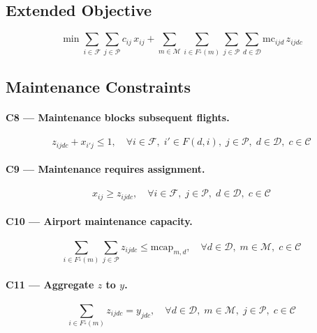 \documentclass[11pt, a4paper]{article}
\theoremstyle{plain}
\theoremstyle{definition}
\theoremstyle{remark}
\newcommand{\F}{\mathcal{F}}        %
\newcommand{\P}{\mathcal{P}}        %
\newcommand{\D}{\mathcal{D}}        %
\newcommand{\C}{\mathcal{C}}        %
\newcommand{\MA}{\mathcal{M}}       %
\begin{document}
\subsection{Extended Objective}

\begin{equation}
  \min \sum_{i \in \F}\sum_{j \in \P} c_{ij}\, x_{ij}
       + \sum_{m \in \MA}\sum_{i \in F^{\downarrow}(m)}\sum_{j \in \P}\sum_{d \in \D}
         \text{mc}_{ijd}\, z_{ijdc}
  \label{eq:obj_ext}
\end{equation}

\subsection{Maintenance Constraints}

\paragraph{C8 — Maintenance blocks subsequent flights.}
\begin{equation}
  z_{ijdc} + x_{i'j} \leq 1,
  \quad \forall i \in \F,\; i' \in F(d,i),\; j \in \P,\; d \in \D,\; c \in \C
  \label{eq:c8}
\end{equation}

\paragraph{C9 — Maintenance requires assignment.}
\begin{equation}
  x_{ij} \geq z_{ijdc},
  \quad \forall i \in \F,\; j \in \P,\; d \in \D,\; c \in \C
  \label{eq:c9}
\end{equation}

\paragraph{C10 — Airport maintenance capacity.}
\begin{equation}
  \sum_{i \in F^{\downarrow}(m)} \sum_{j \in \P} z_{ijdc} \leq \text{mcap}_{m,d},
  \quad \forall d \in \D,\; m \in \MA,\; c \in \C
  \label{eq:c10}
\end{equation}

\paragraph{C11 — Aggregate $z$ to $y$.}
\begin{equation}
  \sum_{i \in F^{\downarrow}(m)} z_{ijdc} = y_{jdc},
  \quad \forall d \in \D,\; m \in \MA,\; j \in \P,\; c \in \C
  \label{eq:c11}
\end{equation}
\end{document}
